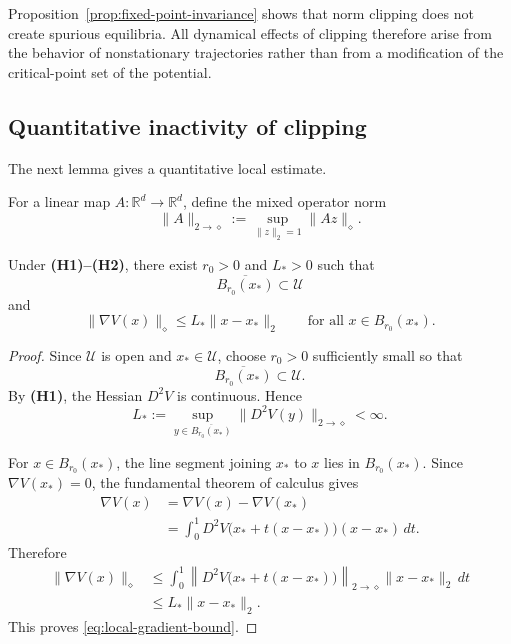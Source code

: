 \begin{remark}
\label{rem:no-spurious-fixed-points}
Proposition~\ref{prop:fixed-point-invariance} shows that norm clipping
does not create spurious equilibria.  All dynamical effects of
clipping therefore arise from the behavior of nonstationary
trajectories rather than from a modification of the critical-point
set of the potential.
\end{remark}

\subsection{Quantitative inactivity of clipping}
\label{subsec:local-inactivity}

The next lemma gives a quantitative local estimate.

For a linear map $A:\mathbb R^d\to\mathbb R^d$, define the mixed
operator norm
\begin{equation}
\|A\|_{2\to\diamond}
:=
\sup_{\|z\|_2=1}
\|Az\|_\diamond.
\label{eq:mixed-operator-norm}
\end{equation}

\begin{lemma}
\label{lem:local-gradient-estimate}
Under \textbf{(H1)--(H2)}, there exist $r_0>0$ and $L_*>0$ such that
\[
\overline{B_{r_0}(x_*)}
\subset\mathcal U
\]
and
\begin{equation}
\|\nabla V(x)\|_\diamond
\leq
L_*\|x-x_*\|_2
\qquad
\text{for all }
x\in B_{r_0}(x_*).
\label{eq:local-gradient-bound}
\end{equation}
\end{lemma}

\begin{proof}
Since $\mathcal U$ is open and $x_*\in\mathcal U$, choose
$r_0>0$ sufficiently small so that
\[
\overline{B_{r_0}(x_*)}
\subset\mathcal U.
\]
By \textbf{(H1)}, the Hessian $D^2V$ is continuous. Hence
\begin{equation}
L_*
:=
\sup_{y\in\overline{B_{r_0}(x_*)}}
\|D^2V(y)\|_{2\to\diamond}
<\infty.
\label{eq:L-star-definition}
\end{equation}

For $x\in B_{r_0}(x_*)$, the line segment joining $x_*$ to $x$
lies in $B_{r_0}(x_*)$. Since $\nabla V(x_*)=0$, the fundamental
theorem of calculus gives
\begin{align}
\nabla V(x)
&=
\nabla V(x)-\nabla V(x_*)
\nonumber\\
&=
\int_0^1
D^2V\bigl(x_*+t(x-x_*)\bigr)(x-x_*)\,dt.
\label{eq:gradient-integral}
\end{align}
Therefore
\begin{align}
\|\nabla V(x)\|_\diamond
&\leq
\int_0^1
\left\|
D^2V\bigl(x_*+t(x-x_*)\bigr)
\right\|_{2\to\diamond}
\|x-x_*\|_2\,dt
\nonumber\\
&\leq
L_*\|x-x_*\|_2.
\end{align}
This proves \eqref{eq:local-gradient-bound}.
\end{proof}

